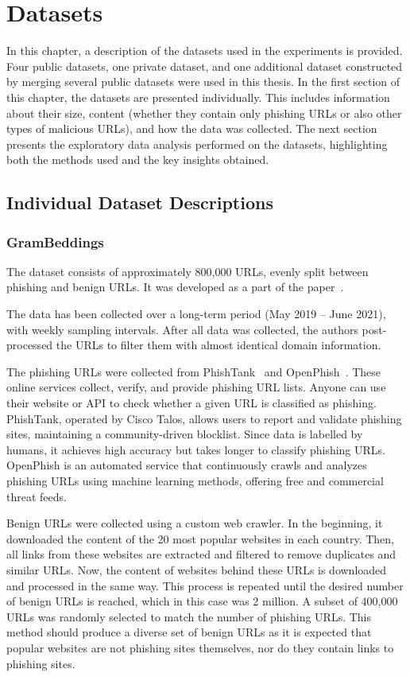 \chapter{Datasets}
In this chapter, a description of the datasets used in the experiments is provided. Four public datasets, one private dataset, and one additional dataset constructed by merging several public datasets were used in this thesis. In the first section of this chapter, the datasets are presented individually. This includes information about their size, content (whether they contain only phishing URLs or also other types of malicious URLs), and how the data was collected. The next section presents the exploratory data analysis performed on the datasets, highlighting both the methods used and the key insights obtained.

\section{Individual Dataset Descriptions}
\label{sec:dataset_descriptions}

\subsection{GramBeddings}
The dataset consists of approximately 800,000 URLs, evenly split between phishing and benign URLs. It was developed as a part of the paper~\cite{GramBeddings}.

The data has been collected over a long-term period (May 2019 -- June 2021), with weekly sampling intervals. After all data was collected, the authors post-processed the URLs to filter them with almost identical domain information.

The phishing URLs were collected from PhishTank~\cite{PhishTank} and OpenPhish~\cite{OpenPhish}. These online services collect, verify, and provide phishing URL lists. Anyone can use their website or API to check whether a given URL is classified as phishing. PhishTank, operated by Cisco Talos, allows users to report and validate phishing sites, maintaining a community-driven blocklist. Since data is labelled by humans, it achieves high accuracy but takes longer to classify phishing URLs. OpenPhish is an automated service that continuously crawls and analyzes phishing URLs using machine learning methods, offering free and commercial threat feeds.

Benign URLs were collected using a custom web crawler. In the beginning, it downloaded the content of the 20 most popular websites in each country. Then, all links from these websites are extracted and filtered to remove duplicates and similar URLs. Now, the content of websites behind these URLs is downloaded and processed in the same way. This process is repeated until the desired number of benign URLs is reached, which in this case was 2 million. A subset of 400,000 URLs was randomly selected to match the number of phishing URLs. This method should produce a diverse set of benign URLs as it is expected that popular websites are not phishing sites themselves, nor do they contain links to phishing sites.

